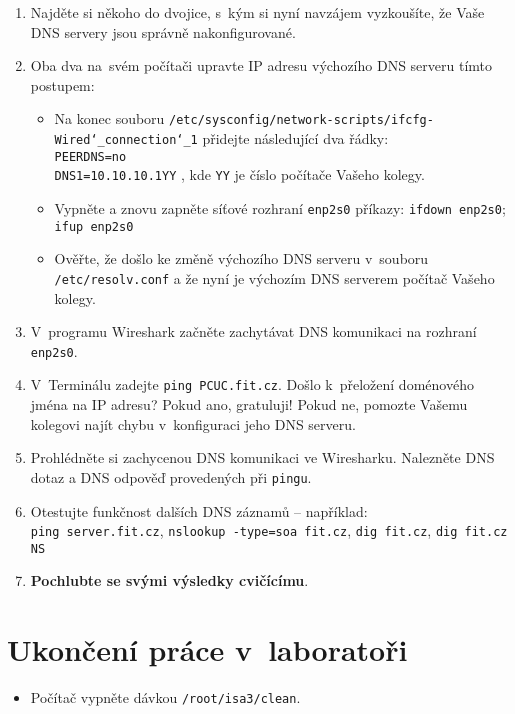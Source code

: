 \begin{enumerate}
  \item Najděte si někoho do dvojice, s~kým si nyní navzájem vyzkoušíte, že Vaše DNS servery jsou správně nakonfigurované.
  \item Oba dva na~svém počítači upravte IP adresu výchozího DNS serveru tímto postupem:
  \begin{itemize}
    \item Na konec souboru {\tt /etc/sysconfig/network-scripts/ifcfg-Wired\char`_connection\char`_1} přidejte následující dva řádky:\\
          \verb|PEERDNS=no|\\
          \verb|DNS1=10.10.10.1YY| , kde {\tt YY} je číslo počítače Vašeho kolegy.
    \item Vypněte a znovu zapněte síťové rozhraní {\tt enp2s0} příkazy: {\tt ifdown enp2s0}; {\tt ifup enp2s0}
    \item Ověřte, že došlo ke změně výchozího DNS serveru v~souboru {\tt /etc/resolv.conf} a že nyní je výchozím DNS serverem počítač Vašeho kolegy.
  \end{itemize}
  \item V~programu Wireshark začněte zachytávat DNS komunikaci na rozhraní {\tt enp2s0}.
  \item V~Terminálu zadejte {\tt ping PCUC.fit.cz}. Došlo k~přeložení doménového jména na IP adresu? Pokud ano, gratuluji! Pokud ne, pomozte Vašemu kolegovi najít chybu
    v~konfiguraci jeho DNS serveru.
  \item Prohlédněte si zachycenou DNS komunikaci ve Wiresharku. Nalezněte DNS dotaz a DNS odpověď provedených při {\tt pingu}.
  \item Otestujte funkčnost dalších DNS záznamů -- například:\\
        {\tt ping server.fit.cz}, {\tt nslookup -type=soa fit.cz}, {\tt dig fit.cz}, {\tt dig fit.cz NS}
  \item {\bf Pochlubte se svými výsledky cvičícímu}.
\end{enumerate}




\section{Ukončení práce v~laboratoři}
\begin{itemize}
  \item Počítač vypněte dávkou {\tt /root/isa3/clean}.
\end{itemize}
